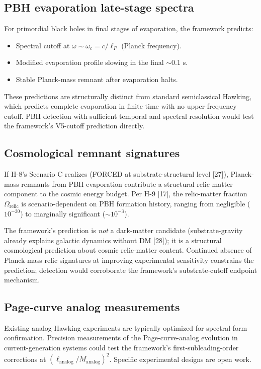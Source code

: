\documentclass[11pt,a4paper]{article}
\begin{document}
\subsection{PBH evaporation late-stage spectra}

For primordial black holes in final stages of evaporation, the framework predicts:
\begin{itemize}[noitemsep]
\item Spectral cutoff at $\omega \sim \omega_c = c/\ell_P$ (Planck frequency).
\item Modified evaporation profile slowing in the final $\sim 0.1$ s.
\item Stable Planck-mass remnant after evaporation halts.
\end{itemize}

These predictions are structurally distinct from standard semiclassical Hawking, which predicts complete evaporation in finite time with no upper-frequency cutoff. PBH detection with sufficient temporal and spectral resolution would test the framework's V5-cutoff prediction directly.

\subsection{Cosmological remnant signatures}

If H-8's Scenario C realizes (FORCED at substrate-structural level [27]), Planck-mass remnants from PBH evaporation contribute a structural relic-matter component to the cosmic energy budget. Per H-9 [17], the relic-matter fraction $\Omega_\mathrm{relic}$ is scenario-dependent on PBH formation history, ranging from negligible ($10^{-30}$) to marginally significant ($\sim 10^{-3}$).

The framework's prediction is \emph{not} a dark-matter candidate (substrate-gravity already explains galactic dynamics without DM [28]); it is a structural cosmological prediction about cosmic relic-matter content. Continued absence of Planck-mass relic signatures at improving experimental sensitivity constrains the prediction; detection would corroborate the framework's substrate-cutoff endpoint mechanism.

\subsection{Page-curve analog measurements}

Existing analog Hawking experiments are typically optimized for spectral-form confirmation. Precision measurements of the Page-curve-analog evolution in current-generation systems could test the framework's first-subleading-order corrections at $(\ell_\mathrm{analog}/M_\mathrm{analog})^{2}$. Specific experimental designs are open work.
\end{document}
